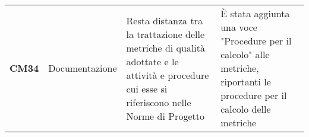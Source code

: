 \documentclass[../piano-di-qualifica.tex]{subfiles}
\begin{document}
\begin{longtable}[H]{>{\centering\bfseries}m{2.5cm} >{\centering}m{2.5cm} >{\centering}m{5.5cm} >{\centering\arraybackslash}m{5.5cm}}
CM34 & Documentazione                                & Resta distanza tra la trattazione delle metriche di qualità adottate e le attività e procedure cui esse si riferiscono nelle Norme di Progetto                                & È stata aggiunta una voce "Procedure per il calcolo" alle metriche, riportanti le procedure per il calcolo delle metriche                                                                                                                                                                                                                           \\

\end{longtable}
\end{document}
